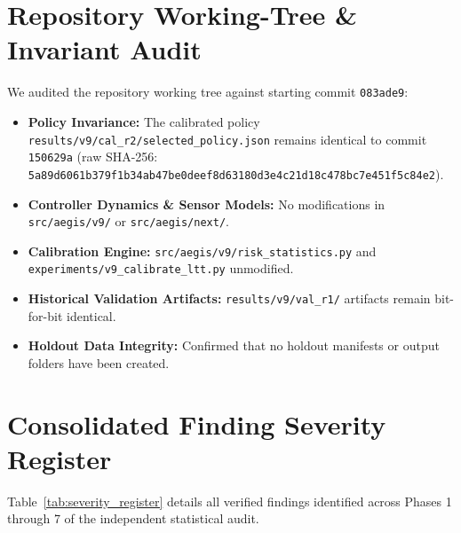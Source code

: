 \documentclass[10pt,a4paper]{article}
\begin{document}
\section{Repository Working-Tree \& Invariant Audit}
We audited the repository working tree against starting commit \texttt{083ade9}:
\begin{itemize}
    \item \textbf{Policy Invariance:} The calibrated policy \texttt{results/v9/cal\_r2/selected\_policy.json} remains identical to commit \texttt{150629a} (raw SHA-256: \texttt{5a89d6061b379f1b34ab47be0deef8d63180d3e4c21d18c478bc7e451f5c84e2}).
    \item \textbf{Controller Dynamics \& Sensor Models:} No modifications in \texttt{src/aegis/v9/} or \texttt{src/aegis/next/}.
    \item \textbf{Calibration Engine:} \texttt{src/aegis/v9/risk\_statistics.py} and \texttt{experiments/v9\_calibrate\_ltt.py} unmodified.
    \item \textbf{Historical Validation Artifacts:} \texttt{results/v9/val\_r1/} artifacts remain bit-for-bit identical.
    \item \textbf{Holdout Data Integrity:} Confirmed that no holdout manifests or output folders have been created.
\end{itemize}

\section{Consolidated Finding Severity Register}
Table~\ref{tab:severity_register} details all verified findings identified across Phases 1 through 7 of the independent statistical audit.
\end{document}
